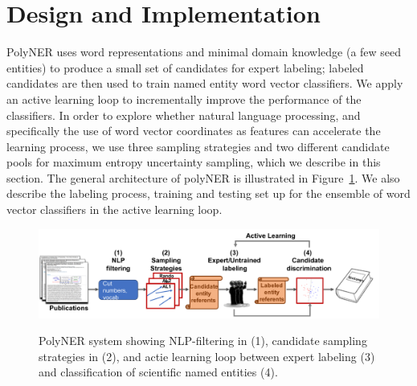 \label{sect:architecture}
\section{Design and Implementation}
PolyNER uses word representations and minimal domain knowledge (a few
seed entities) to produce a small set of candidates for expert labeling;
labeled candidates are then used to train named entity word vector classifiers.
We apply an active learning loop to incrementally improve the performance of the classifiers.
In order to explore whether natural language processing, and specifically the use of word vector coordinates as features can accelerate the learning process,
we use three sampling strategies and two different candidate pools for maximum entropy uncertainty sampling, which we describe in this section.
The general architecture of polyNER is illustrated in Figure~\ref{fig:architecture}.
We also describe the labeling process, training and testing set up for the ensemble of word vector classifiers in the active learning loop. 

\begin{figure}[!t]
{\includegraphics[width=\textwidth]{figures/architecture.pdf}}
\caption{\label{fig:architecture} PolyNER system showing NLP-filtering in (1), candidate sampling strategies in (2), and actie learning loop between expert labeling (3) and classification of scientific named entities (4). 
}
\end{figure}

